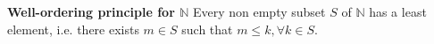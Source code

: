 \documentclass[10pt,landscape]{article}
\makeatletter
\renewcommand{\subsection}{\@startsection{subsection}{2}{0mm}%
                                {-1explus -.5ex minus -.2ex}%
                                {0.5ex plus .2ex}%
                                {\normalfont\normalsize\bfseries}}
\makeatother
\begin{document}
\begin{multicols}{4}




\textbf{Well-ordering principle for $\mathbb{N}$} Every non empty subset $S$ of $\mathbb{N}$ has a least element, i.e. there exists $m \in S$ such that $m \leq k, \forall k \in S$.














\end{multicols}
\end{document}
